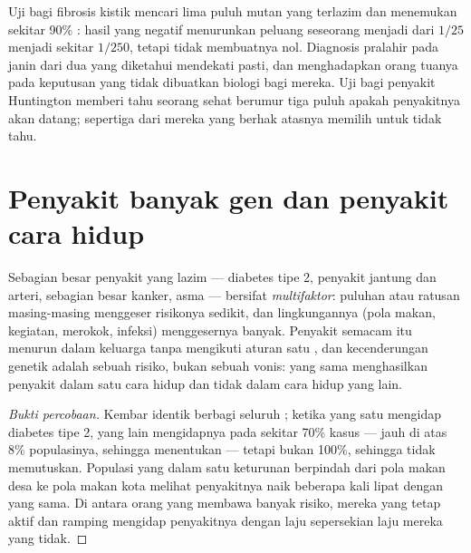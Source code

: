 \begin{example}\label{ex:g11:genes-and-disease:testsays}
Uji  bagi fibrosis kistik mencari lima puluh  mutan yang
terlazim dan menemukan sekitar 90\% : hasil yang negatif
menurunkan peluang seseorang menjadi  dari $1/25$ menjadi
sekitar $1/250$, tetapi tidak membuatnya nol. Diagnosis pralahir pada
janin dari dua  yang diketahui mendekati pasti, dan
menghadapkan orang tuanya pada keputusan yang tidak dibuatkan biologi
bagi mereka. Uji bagi penyakit Huntington memberi tahu seorang sehat
berumur tiga puluh apakah penyakitnya akan datang; sepertiga dari
mereka yang berhak atasnya memilih untuk tidak tahu.
\end{example}

\section{Penyakit banyak gen dan penyakit cara hidup}

\begin{proposition}\label{prop:g11:genes-and-disease:multifactorial}
Sebagian besar penyakit yang lazim --- diabetes tipe 2, penyakit
jantung dan arteri, sebagian besar kanker, asma --- bersifat
\emph{multifaktor}: puluhan atau ratusan
 masing-masing menggeser risikonya sedikit, dan lingkungannya (pola
makan, kegiatan, merokok, infeksi) menggesernya banyak. Penyakit
semacam itu menurun dalam keluarga tanpa mengikuti aturan satu , dan
kecenderungan genetik adalah sebuah risiko, bukan sebuah vonis: 
yang sama menghasilkan penyakit dalam satu cara hidup dan tidak dalam
cara hidup yang lain.
\end{proposition}
\begin{proof}[Bukti percobaan]
Kembar identik berbagi seluruh ; ketika yang satu mengidap
diabetes tipe 2, yang lain mengidapnya pada sekitar 70\% kasus --- jauh
di atas 8\% populasinya, sehingga  menentukan --- tetapi bukan
100\%, sehingga  tidak memutuskan. Populasi yang dalam satu
keturunan berpindah dari pola makan desa ke pola makan kota melihat
penyakitnya naik beberapa kali lipat dengan  yang sama. Di antara
orang yang membawa banyak  risiko, mereka yang tetap aktif dan
ramping mengidap penyakitnya dengan laju sepersekian laju mereka yang
tidak.
\end{proof}

